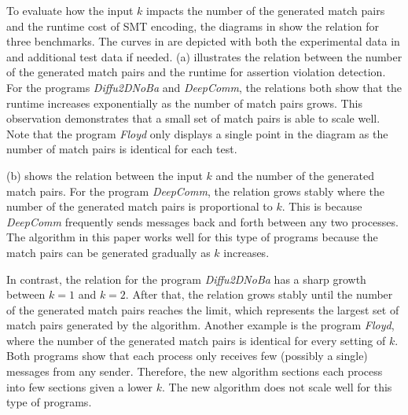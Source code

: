 To evaluate how the input $k$ impacts the number of the generated match pairs and the runtime cost of SMT encoding, the diagrams in  show the relation for three benchmarks. The curves in  are depicted with both the experimental data in  and additional test data if needed.  (a) illustrates the relation between the number of the generated match pairs and the runtime for assertion violation detection. For the programs \textit{Diffu2DNoBa} and \textit{DeepComm}, the relations both show that the runtime increases exponentially as the number of match pairs grows. This observation demonstrates that a small set of match pairs is able to scale well. Note that the program \textit{Floyd} only displays a single point in the diagram as the number of match pairs is identical for each test.


 (b) shows the relation between the input $k$ and the number of the generated match pairs. For the program \textit{DeepComm}, the relation grows stably where the number of the generated match pairs is proportional to $k$. 
This is because \textit{DeepComm} frequently sends messages back and forth between any two processes. The algorithm in this paper works well for this type of programs because the match pairs can be generated gradually as $k$ increases.

In contrast, the relation for the program \textit{Diffu2DNoBa} has a sharp growth between $k=1$ and $k=2$. After that, the relation grows stably until the number of the generated match pairs reaches the limit, which represents the largest set of match pairs generated by the algorithm. 
Another example is the program \textit{Floyd}, where the number of the generated match pairs is identical for every setting of $k$. 
Both programs show that each process only receives few (possibly a single) messages from any sender.
Therefore, the new algorithm sections each process into few sections given a lower $k$. 
The new algorithm does not scale well for this type of programs.



